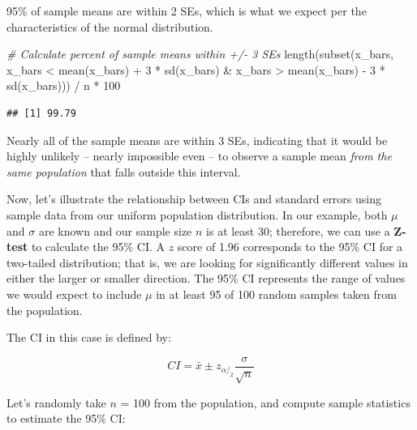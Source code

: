 \documentclass[
]{book}
\newenvironment{Shaded}{\begin{snugshade}}{\end{snugshade}}
\newcommand{\CommentTok}[1]{\textcolor[rgb]{0.56,0.35,0.01}{\textit{#1}}}
\newcommand{\DecValTok}[1]{\textcolor[rgb]{0.00,0.00,0.81}{#1}}
\newcommand{\FunctionTok}[1]{\textcolor[rgb]{0.00,0.00,0.00}{#1}}
\newcommand{\NormalTok}[1]{#1}
\newcommand{\SpecialCharTok}[1]{\textcolor[rgb]{0.00,0.00,0.00}{#1}}
\begin{document}
95\% of sample means are within 2 SEs, which is what we expect per the characteristics of the normal distribution.

\begin{Shaded}
\begin{Highlighting}[]
\CommentTok{\# Calculate percent of sample means within +/{-} 3 SEs}
\FunctionTok{length}\NormalTok{(}\FunctionTok{subset}\NormalTok{(x\_bars, x\_bars }\SpecialCharTok{\textless{}} \FunctionTok{mean}\NormalTok{(x\_bars) }\SpecialCharTok{+} \DecValTok{3} \SpecialCharTok{*} \FunctionTok{sd}\NormalTok{(x\_bars) }\SpecialCharTok{\&}\NormalTok{ x\_bars }\SpecialCharTok{\textgreater{}} \FunctionTok{mean}\NormalTok{(x\_bars) }\SpecialCharTok{{-}} \DecValTok{3} \SpecialCharTok{*} \FunctionTok{sd}\NormalTok{(x\_bars))) }\SpecialCharTok{/}\NormalTok{ n }\SpecialCharTok{*} \DecValTok{100}
\end{Highlighting}
\end{Shaded}

\begin{verbatim}
## [1] 99.79
\end{verbatim}

Nearly all of the sample means are within 3 SEs, indicating that it would be highly unlikely -- nearly impossible even -- to observe a sample mean \emph{from the same population} that falls outside this interval.

Now, let's illustrate the relationship between CIs and standard errors using sample data from our uniform population distribution. In our example, both \(\mu\) and \(\sigma\) are known and our sample size \(n\) is at least 30; therefore, we can use a \textbf{Z-test} to calculate the 95\% CI. A \(z\) score of 1.96 corresponds to the 95\% CI for a two-tailed distribution; that is, we are looking for significantly different values in either the larger or smaller direction. The 95\% CI represents the range of values we would expect to include \(\mu\) in at least 95 of 100 random samples taken from the population.

The CI in this case is defined by:

\[ CI = \bar{x} \pm z_{\alpha/_2} \frac{\sigma}{\sqrt{n}} \]

Let's randomly take \(n\) = 100 from the population, and compute sample statistics to estimate the 95\% CI:
\end{document}
